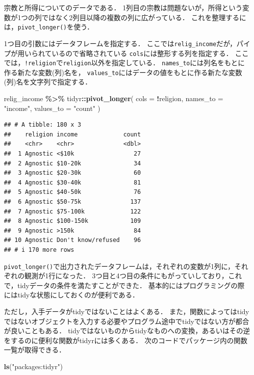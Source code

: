 \documentclass[
]{article}
\newenvironment{Shaded}{\begin{snugshade}}{\end{snugshade}}
\newcommand{\AttributeTok}[1]{\textcolor[rgb]{0.13,0.29,0.53}{#1}}
\newcommand{\FunctionTok}[1]{\textcolor[rgb]{0.13,0.29,0.53}{\textbf{#1}}}
\newcommand{\NormalTok}[1]{#1}
\newcommand{\SpecialCharTok}[1]{\textcolor[rgb]{0.81,0.36,0.00}{\textbf{#1}}}
\newcommand{\StringTok}[1]{\textcolor[rgb]{0.31,0.60,0.02}{#1}}
\begin{document}
宗教と所得についてのデータである．
1列目の宗教は問題ないが，所得という変数が1つの列ではなく2列目以降の複数の列に広がっている．
これを整理するには，\texttt{pivot\_longer()}を使う．

1つ目の引数にはデータフレームを指定する．
ここでは\texttt{relig\_income}だが，パイプが用いられているので省略されている
\texttt{cols}には整形する列を指定する．
ここでは，\texttt{!religion}で\texttt{religion}以外を指定している．
\texttt{names\_to}には列名をもとに作る新たな変数(列)名を，
\texttt{values\_to}にはデータの値をもとに作る新たな変数(列)名を文字列で指定する．

\begin{Shaded}
\begin{Highlighting}[]
\NormalTok{relig\_income }\SpecialCharTok{\%\textgreater{}\%} 
\NormalTok{  tidyr}\SpecialCharTok{::}\FunctionTok{pivot\_longer}\NormalTok{(}
    \AttributeTok{cols =} \SpecialCharTok{!}\NormalTok{religion, }
    \AttributeTok{names\_to =} \StringTok{"income"}\NormalTok{, }
    \AttributeTok{values\_to =} \StringTok{"count"}
\NormalTok{  )}
\end{Highlighting}
\end{Shaded}

\begin{verbatim}
## # A tibble: 180 x 3
##    religion income             count
##    <chr>    <chr>              <dbl>
##  1 Agnostic <$10k                 27
##  2 Agnostic $10-20k               34
##  3 Agnostic $20-30k               60
##  4 Agnostic $30-40k               81
##  5 Agnostic $40-50k               76
##  6 Agnostic $50-75k              137
##  7 Agnostic $75-100k             122
##  8 Agnostic $100-150k            109
##  9 Agnostic >150k                 84
## 10 Agnostic Don't know/refused    96
## # i 170 more rows
\end{verbatim}

\texttt{pivot\_longer()}で出力されたデータフレームは，それぞれの変数が1列に，それぞれの観測が1行になった．
3つ目と4つ目の条件にもがっていしており，これで，tidyデータの条件を満たすことができた．
基本的にはプログラミングの際にはtidyな状態にしておくのが便利である．

ただし，入手データがtidyではないことはよくある．
また，関数によってはtidyではないオブジェクトを入力する必要やプログラム途中でtidyではない方が都合が良いこともある．
tidyではないものからtidyなものへの変換，あるいはその逆をするのに便利な関数がtidyrには多くある．
次のコードでパッケージ内の関数一覧が取得できる．

\begin{Shaded}
\begin{Highlighting}[]
\FunctionTok{ls}\NormalTok{(}\StringTok{"packages:tidyr"}\NormalTok{)}
\end{Highlighting}
\end{Shaded}
\end{document}
